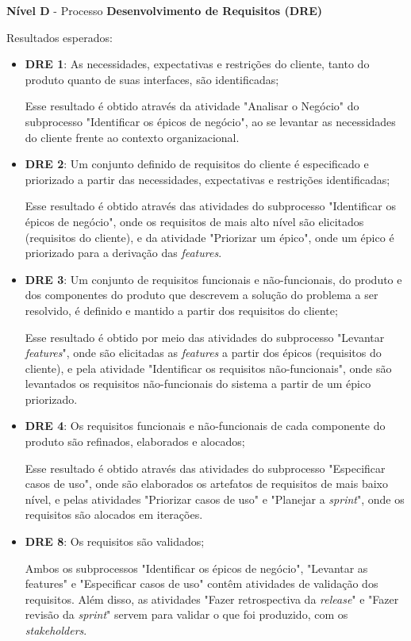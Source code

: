      \noindent
      \textbf{Nível D} - Processo \textbf{Desenvolvimento de Requisitos (DRE)}
	  
	  \noindent
	  Resultados esperados:
	  
	  \begin{itemize}
	  
	  \item \textbf{DRE 1}: As necessidades, expectativas e restrições do cliente, tanto do produto quanto
	    de suas interfaces, são identificadas;
	    
	    Esse resultado é obtido através da atividade "Analisar o Negócio" do subprocesso "Identificar os épicos de negócio",
	    ao se levantar as necessidades do cliente frente ao contexto organizacional.
	  
	  \item \textbf{DRE 2}: Um conjunto definido de requisitos do cliente é especificado e priorizado a partir das
	    necessidades, expectativas e restrições identificadas;
	    
	    Esse resultado é obtido através das atividades do subprocesso "Identificar os épicos de negócio", onde os
	    requisitos de mais alto nível são elicitados (requisitos do cliente), e da atividade "Priorizar um épico", onde 
	    um épico é priorizado para a derivação das \textit{features}.
	  
	  \item \textbf{DRE 3}: Um conjunto de requisitos funcionais e não-funcionais, do produto e dos componentes do produto
	    que descrevem a solução do problema a ser resolvido, é definido e mantido a partir dos requisitos do cliente;
	    
	    Esse resultado é obtido por meio das atividades do subprocesso "Levantar \textit{features}", onde são elicitadas
	    as \textit{features} a partir dos épicos (requisitos do cliente), e pela atividade
	    "Identificar os requisitos não-funcionais", onde são levantados os requisitos não-funcionais do sistema a partir de
	    um épico priorizado.
	    
	  \item \textbf{DRE 4}: Os requisitos funcionais e não-funcionais de cada componente do produto são refinados, 
	    elaborados e alocados;
	    
	    Esse resultado é obtido através das atividades do subprocesso "Especificar casos de uso", onde são elaborados
	    os artefatos de requisitos de mais baixo nível, e pelas atividades "Priorizar casos de uso" e 
	    "Planejar a \textit{sprint}", onde os requisitos são alocados em iterações. 
	    
	  \item \textbf{DRE 8}: Os requisitos são validados;
	  
	     Ambos os subprocessos "Identificar os épicos de negócio", "Levantar as features" e "Especificar casos de uso" contêm
	     atividades de validação dos requisitos. Além disso, as atividades "Fazer retrospectiva da \textit{release}" e 
	     "Fazer revisão da \textit{sprint}" servem para validar o que foi produzido, com os \textit{stakeholders}.
	  
	  \end{itemize}
      

  